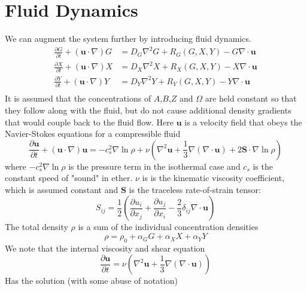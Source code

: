 \documentclass{article}
\begin{document}
\section{Fluid Dynamics}
We can augment the system further by introducing fluid dynamics.
\begin{align}
\frac{\partial G}{\partial t} + (\mathbf u \cdot \nabla) G &= D_G \nabla^2 G + R_G(G, X, Y) - G \nabla \cdot \mathbf u \label{eq:fluid_model_G}\\
\frac{\partial X}{\partial t} + (\mathbf u \cdot \nabla) X &= D_X \nabla^2 X + R_X(G, X, Y) - X \nabla \cdot \mathbf u \\
\frac{\partial Y}{\partial t} + (\mathbf u \cdot \nabla) Y &= D_Y \nabla^2 Y + R_Y(G, X, Y) - Y \nabla \cdot \mathbf u \\
\end{align}
It is assumed that the concentrations of $A$,$B$,$Z$ and $\Omega$ are held constant so that they follow along with the fluid, but do not cause additional density gradients that would couple back to the fluid flow.
Here $\mathbf u$ is a velocity field that obeys the Navier-Stokes equations for a compressible fluid
\begin{equation}
\frac{\partial \mathbf u}{\partial t} + (\mathbf u \cdot \nabla) \mathbf u = -c_s^2 \nabla \ln \rho + \nu \left (\nabla^2 \mathbf u + \frac{1}{3}\nabla(\nabla \cdot \mathbf u) + 2 \mathbf S \cdot \nabla \ln \rho \right ) \label{eq:navier-stokes}
\end{equation}
where $-c_s^2\nabla \ln \rho$ is the pressure term in the isothermal case and $c_s$ is the constant speed of "sound" in ether. $\nu$ is is the kinematic viscosity coefficient, which is assumed constant and $\mathbf S$ is the traceless rate-of-strain tensor:
\begin{equation}
S_{ij} = \frac{1}{2}\left ( \frac{\partial u_i}{\partial x_j} + \frac{\partial u_j}{\partial x_i} - \frac{2}{3}\delta_{ij}\nabla \cdot \mathbf u \right )
\end{equation}
The total density $\rho$ is a sum of the individual concentration densities
\begin{equation}
\rho = \rho_0 + \alpha_G G + \alpha_X X + \alpha_Y Y
\end{equation}
We note that the internal viscosity and shear equation
\begin{equation}
\frac{\partial \mathbf u}{\partial t} = \nu \left (\nabla^2 \mathbf u + \frac{1}{3}\nabla(\nabla \cdot \mathbf u) \right )
\end{equation}
Has the solution (with some abuse of notation)
\end{document}
